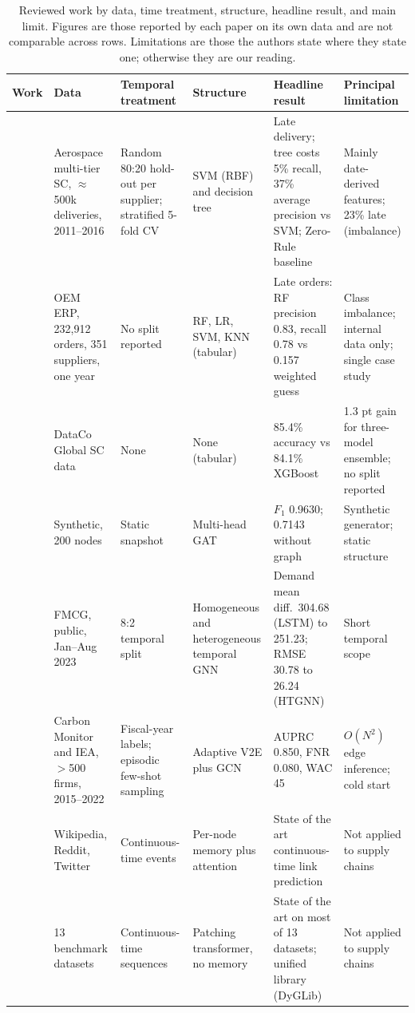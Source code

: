 \documentclass[10pt]{article}
\begin{document}
\begin{table}[!h]
\centering
\caption{Reviewed work by data, time treatment, structure, headline result, and main limit. Figures are those reported by each paper on its own data and are not comparable across rows. Limitations are those the authors state where they state one; otherwise they are our reading.}
\label{tab:litsynth}
\tiny
\begin{tabular}{L{1.35cm} L{1.85cm} L{1.7cm} L{1.55cm} L{2.15cm} L{2.15cm}}
\toprule
\textbf{Work} & \textbf{Data} & \textbf{Temporal treatment} & \textbf{Structure} & \textbf{Headline result} & \textbf{Principal limitation} \\
\midrule
\citet{ref35} & Aerospace multi-tier SC, $\approx$500k deliveries, 2011--2016 & Random 80:20 hold-out per supplier; stratified 5-fold CV & SVM (RBF) and decision tree & Late delivery; tree costs 5\% recall, 37\% average precision vs SVM; Zero-Rule baseline & Mainly date-derived features; 23\% late (imbalance) \\
\citet{ref36} & OEM ERP, 232,912 orders, 351 suppliers, one year & No split reported & RF, LR, SVM, KNN (tabular) & Late orders: RF precision 0.83, recall 0.78 vs 0.157 weighted guess & Class imbalance; internal data only; single case study \\
\citet{ref2} & DataCo Global SC data & None & None (tabular) & 85.4\% accuracy vs 84.1\% XGBoost & 1.3 pt gain for three-model ensemble; no split reported \\
\citet{ref5} & Synthetic, 200 nodes & Static snapshot & Multi-head GAT & $F_1$ 0.9630; 0.7143 without graph & Synthetic generator; static structure \\
\citet{ref6} & FMCG, public, Jan--Aug 2023 & 8:2 temporal split & Homogeneous and heterogeneous temporal GNN & Demand mean diff.\ 304.68 (LSTM) to 251.23; RMSE 30.78 to 26.24 (HTGNN) & Short temporal scope \\
\citet{ref7} & Carbon Monitor and IEA, $>$500 firms, 2015--2022 & Fiscal-year labels; episodic few-shot sampling & Adaptive V2E plus GCN & AUPRC 0.850, FNR 0.080, WAC 45 & $O(N^2)$ edge inference; cold start \\
\citet{ref10} & Wikipedia, Reddit, Twitter & Continuous-time events & Per-node memory plus attention & State of the art continuous-time link prediction & Not applied to supply chains \\
\citet{ref11} & 13 benchmark datasets & Continuous-time sequences & Patching transformer, no memory & State of the art on most of 13 datasets; unified library (DyGLib) & Not applied to supply chains \\

\end{tabular}
\end{table}
\end{document}
